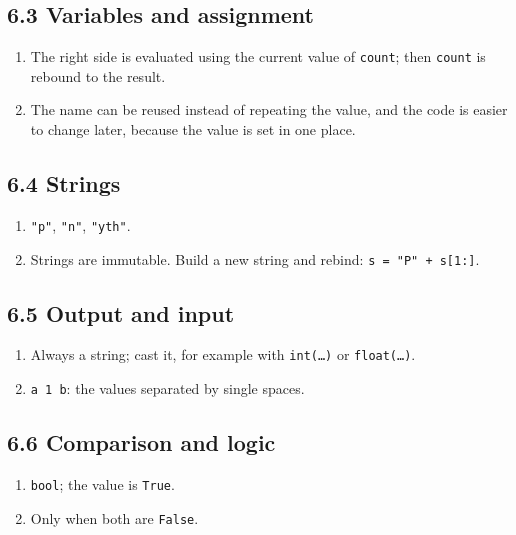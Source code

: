 \documentclass[11pt]{article}
\begin{document}
\begin{keepsection}\subsection{6.3 Variables and assignment}

\begin{enumerate}
\item The right side is evaluated using the current value of \texttt{count}; then \texttt{count} is rebound to the result.
\item The name can be reused instead of repeating the value, and the code is easier to change later, because the value is set in one place.
\end{enumerate}

\end{keepsection}
\begin{keepsection}\subsection{6.4 Strings}

\begin{enumerate}
\item \texttt{"p"}, \texttt{"n"}, \texttt{"yth"}.
\item Strings are immutable. Build a new string and rebind: \texttt{s = "P" + s[1:]}.
\end{enumerate}

\end{keepsection}
\begin{keepsection}\subsection{6.5 Output and input}

\begin{enumerate}
\item Always a string; cast it, for example with \texttt{int(…)} or \texttt{float(…)}.
\item \texttt{a 1 b}: the values separated by single spaces.
\end{enumerate}

\end{keepsection}
\begin{keepsection}\subsection{6.6 Comparison and logic}

\begin{enumerate}
\item \texttt{bool}; the value is \texttt{True}.
\item Only when both are \texttt{False}.
\end{enumerate}

\end{keepsection}
\end{document}
